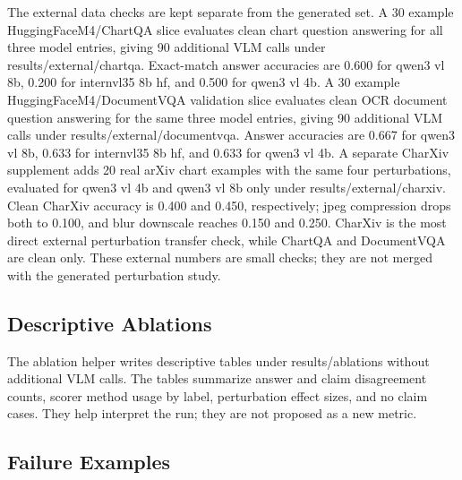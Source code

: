 \documentclass{article}
\begin{document}
The external data checks are kept separate from the generated set. A 30 example HuggingFaceM4/ChartQA slice evaluates clean chart question answering for all three model entries, giving 90 additional VLM calls under results/external/chartqa. Exact-match answer accuracies are 0.600 for qwen3 vl 8b, 0.200 for internvl35 8b hf, and 0.500 for qwen3 vl 4b. A 30 example HuggingFaceM4/DocumentVQA validation slice evaluates clean OCR document question answering for the same three model entries, giving 90 additional VLM calls under results/external/documentvqa. Answer accuracies are 0.667 for qwen3 vl 8b, 0.633 for internvl35 8b hf, and 0.633 for qwen3 vl 4b. A separate CharXiv supplement adds 20 real arXiv chart examples with the same four perturbations, evaluated for qwen3 vl 4b and qwen3 vl 8b only under results/external/charxiv. Clean CharXiv accuracy is 0.400 and 0.450, respectively; jpeg compression drops both to 0.100, and blur downscale reaches 0.150 and 0.250. CharXiv is the most direct external perturbation transfer check, while ChartQA and DocumentVQA are clean only. These external numbers are small checks; they are not merged with the generated perturbation study.

\subsection{Descriptive Ablations}

The ablation helper writes descriptive tables under results/ablations without additional VLM calls. The tables summarize answer and claim disagreement counts, scorer method usage by label, perturbation effect sizes, and no claim cases. They help interpret the run; they are not proposed as a new metric.

\subsection{Failure Examples}
\end{document}
